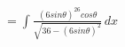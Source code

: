 \documentclass[preview]{standalone}
\begin{document}
\begin{align*}
&=\int \frac{(6sin\theta)^26cos\theta}{\sqrt{36-(6sin\theta)^2}} \, dx
\end{align*}
\end{document}
